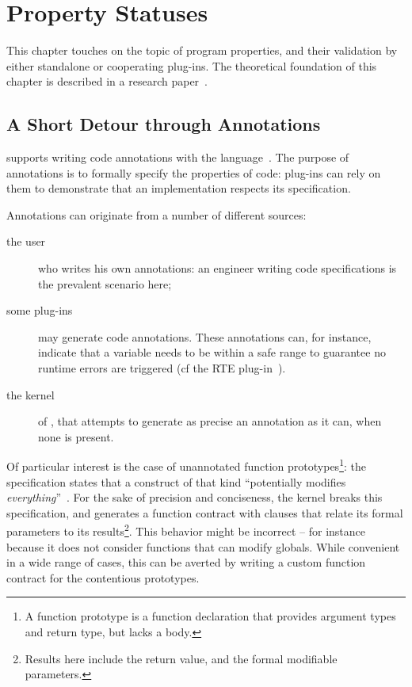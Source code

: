 \chapter{Property Statuses}
\label{user-properties}

This chapter touches on the topic of program properties, and their validation
by either standalone or cooperating \FramaC plug-ins. The theoretical foundation
of this chapter is described in a research paper~\cite{fmics12}.

\section{A Short Detour through Annotations}
\label{user-properties-annotations}

\FramaC supports writing code annotations with the \acsl language~\cite{acsl}.
The purpose of annotations is to formally specify the properties of \C code:
\FramaC plug-ins can rely on them to demonstrate that an implementation
respects its specification.

Annotations can originate from a number of different sources: 
\begin{description}
\item [the user] who writes his own annotations: an engineer writing code
specifications is the prevalent scenario here;
\item [some plug-ins] may generate code annotations. These annotations can, for
instance, indicate that a variable needs to be within a safe range to guarantee
no runtime errors are triggered (cf the RTE plug-in~\cite{rte}).
\item [the kernel] of \FramaC, that attempts to generate as precise an
annotation as it can, when none is present. 
\end{description}

\begin{important}
Of particular interest is the case of unannotated function
prototypes\footnote{A function prototype is a function declaration that
provides argument types and return type, but lacks a body.}: the \acsl
specification states that a construct of that kind ``potentially modifies
\emph{everything}''~\cite[Sec.~2.3.5]{acsl}.  For the sake of precision and
conciseness, the \FramaC kernel breaks this specification, and generates a
function contract with clauses that relate its formal parameters to its
results\footnote{Results here include the return value, and the formal
modifiable parameters.}. This behavior might be incorrect -- for instance
because it does not consider functions that can modify globals. While
convenient in a wide range of cases, this  can be averted by writing a
custom function contract for the contentious prototypes.
\end{important}

